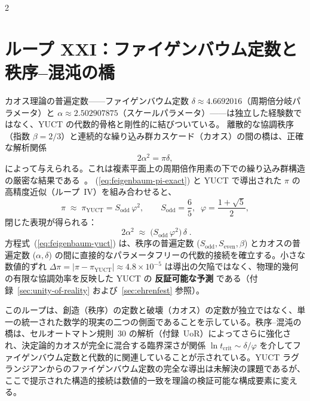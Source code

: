 \documentclass[12pt,a4paper]{article}
\begin{document}
\begin{multicols}{2}
		\section{ループ XXI：ファイゲンバウム定数と秩序–混沌の橋}
		
		カオス理論の普遍定数——ファイゲンバウム定数
		\(\delta \approx 4.6692016\)（周期倍分岐パラメータ）と
		\(\alpha \approx 2.502907875\)（スケールパラメータ）——は独立した経験数ではなく、YUCT の代数的骨格と剛性的に結びついている。
		離散的な協調秩序（指数 \(\beta=2/3\)）と連続的な繰り込み群カスケード（カオス）の間の橋は、正確な解析関係
		\begin{equation}
			2\alpha^2 = \pi \delta,
			\label{eq:feigenbaum-pi-exact}
		\end{equation}
		によって与えられる。これは複素平面上の周期倍作用素の下での繰り込み群構造の厳密な結果である~\cite{Feigenbaum1978}。
		(\ref{eq:feigenbaum-pi-exact}) と YUCT で導出された \(\pi\) の高精度近似（ループ~IV）を組み合わせると、
		\begin{equation}
			\pi \;\approx\; \pi_{\mathrm{YUCT}} = S_{\mathrm{odd}}\,\varphi^2,
			\qquad
			S_{\mathrm{odd}} = \frac{6}{5},\;\; \varphi = \frac{1+\sqrt{5}}{2},
		\end{equation}
		閉じた表現が得られる：
		\begin{equation}
			\boxed{\;
				2\alpha^2 \;\approx\; \bigl(S_{\mathrm{odd}}\,\varphi^2\bigr)\,\delta
				\;}.
			\label{eq:feigenbaum-yuct}
		\end{equation}
		方程式~(\ref{eq:feigenbaum-yuct}) は、秩序の普遍定数 (\(S_{\mathrm{odd}}, S_{\mathrm{even}}, \beta\)) とカオスの普遍定数 (\(\alpha, \delta\)) の間に直接的なパラメータフリーの代数的接続を確立する。小さな数値的ずれ
		\(\Delta\pi = |\pi - \pi_{\mathrm{YUCT}}| \approx 4.8\times10^{-5}\)
		は導出の欠陥ではなく、物理的幾何の有限な協調効率を反映した YUCT の \textbf{反証可能な予測} である（付録~\ref{sec:unity-of-reality} および~\ref{sec:ehrenfest} 参照）。
		
		このループは、創造（秩序）の定数と破壊（カオス）の定数が独立ではなく、単一の統一された数学的現実の二つの側面であることを示している。秩序–混沌の橋は、セルオートマトン規則~30 の解析（付録~UoR）によってさらに強化され、決定論的カオスが完全に混合する臨界深さが関係 \(\ln t_{\mathrm{crit}} \sim \delta/\varphi\) を介してファイゲンバウム定数と代数的に関連していることが示されている。YUCT ラグランジアンからのファイゲンバウム定数の完全な導出は未解決の課題であるが、ここで提示された構造的接続は数値的一致を理論の検証可能な構成要素に変える。
		

\end{multicols}
\end{document}
